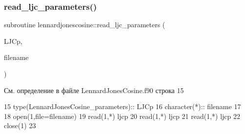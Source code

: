 \subsubsection{\texorpdfstring{read\+\_\+ljc\+\_\+parameters()}{read\_ljc\_parameters()}}
{\footnotesize\ttfamily subroutine lennardjonescosine\+::read\+\_\+ljc\+\_\+parameters (\begin{DoxyParamCaption}\item[{type(\mbox{\hyperlink{structlennardjonescosine_1_1lennardjonescosine__parameters}{lennardjonescosine\+\_\+parameters}})}]{L\+J\+Cp,  }\item[{character($\ast$)}]{filename }\end{DoxyParamCaption})}



См. определение в файле Lennard\+Jones\+Cosine.\+f90 строка 15


\begin{DoxyCode}
15     \textcolor{keywordtype}{type}(LennardJonesCosine\_parameters):: LJCp
16     \textcolor{keywordtype}{character(*)}::  filename
17     
18     \textcolor{keyword}{open}(1,file=filename)
19     \textcolor{keyword}{read}(1,*) ljcp%
20     \textcolor{keyword}{read}(1,*) ljcp%
21     \textcolor{keyword}{read}(1,*) ljcp%
22     \textcolor{keyword}{close}(1)
23     
\end{DoxyCode}
